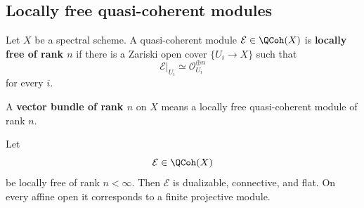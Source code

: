 \subsection{Locally free quasi-coherent modules}

\begin{definition}
\label{def:locally-free-qcoh}
Let $X$ be a spectral scheme. A quasi-coherent module
$\mathcal E\in\QCoh(X)$ is \textbf{locally free of rank $n$} if there is a
Zariski open cover $\{U_i\to X\}$ such that
\[
    \mathcal E|_{U_i}
    \simeq
    \mathcal O_{U_i}^{\oplus n}
\]
for every $i$.
\end{definition}

A \textbf{vector bundle of rank $n$} on $X$ means a locally free
quasi-coherent module of rank $n$.

\begin{proposition}
\label{prop:locally-free-finite-projective}
Let
\[
    \mathcal E
    \in
    \QCoh(X)
\]
be locally free of rank \(n<\infty\). Then \(\mathcal E\) is dualizable,
connective, and flat. On every affine open it corresponds to a finite
projective module.
\end{proposition}

